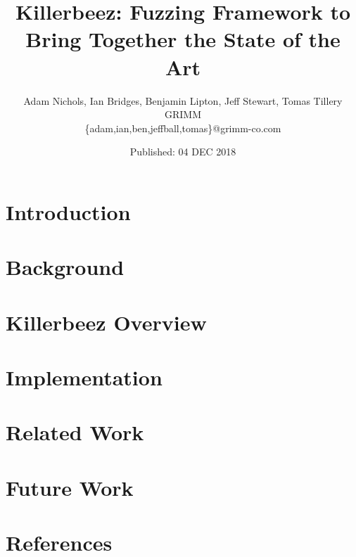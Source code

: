 \documentclass[twocolumn]{article}
\title{Killerbeez: Fuzzing Framework to Bring Together the State of the Art}
\author{Adam Nichols, Ian Bridges, Benjamin Lipton, Jeff Stewart, Tomas Tillery \\
GRIMM\\
\{adam,ian,ben,jeffball,tomas\}@grimm-co.com}
\date{Published: 04 DEC 2018}
\begin{document}
\maketitle




\section{Introduction} \label{Introduction}


\section{Background} \label{Background}


\section{Killerbeez Overview} \label{Killerbeez Overview}


\section{Implementation} \label{Implementation}




\section{Related Work} \label{Related Work}


\section{Future Work} \label{Future Work}


\section{References} \label{References}
\renewcommand{\section}[2]{}  %

\end{document}
